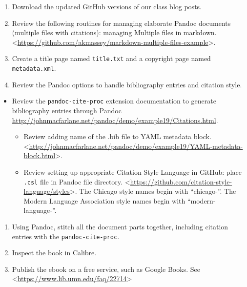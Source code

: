 \documentclass[]{article}
\begin{document}
\begin{enumerate}
\def\labelenumi{\arabic{enumi}.}
\itemsep1pt\parskip0pt
\item
  Download the updated GitHub versions of our class blog posts.
\item
  Review the following routines for managing elaborate Pandoc documents
  (multiple files with citations): managing Multiple files in markdown.
  \textless{}\url{https://github.com/akmassey/markdown-multiple-files-example}\textgreater{}.
\item
  Create a title page named \texttt{title.txt} and a copyright page
  named \texttt{metadata.xml}.
\item
  Review the Pandoc options to handle bibliography entries and citation
  style.
\end{enumerate}

\begin{itemize}
\itemsep1pt\parskip0pt
\item
  Review the \texttt{pandoc-cite-proc} extension documentation to
  generate bibliography entries through Pandoc
  \url{http://johnmacfarlane.net/pandoc/demo/example19/Citations.html}.

  \begin{itemize}
  \itemsep1pt\parskip0pt
  \item
    Review adding name of the .bib file to YAML metadata block.
    \textless{}\url{http://johnmacfarlane.net/pandoc/demo/example19/YAML-metadata-block.html}\textgreater{}.
  \item
    Review setting up appropriate Citation Style Language in GitHub:
    place \texttt{.csl} file in Pandoc file directory.
    \textless{}\url{https://github.com/citation-style-language/styles}\textgreater{}.
    The Chicago style names begin with ``chicago-''. The Modern Language
    Association style names begin with ``modern-language-''.
  \end{itemize}
\end{itemize}

\begin{enumerate}
\def\labelenumi{\arabic{enumi}.}
\setcounter{enumi}{4}
\itemsep1pt\parskip0pt
\item
  Using Pandoc, stitch all the document parts together, including
  citation entries with the \texttt{pandoc-cite-proc}.
\item
  Inspect the book in Calibre.
\item
  Publish the ebook on a free service, such as Google Books. See
  \textless{}\url{https://www.lib.umn.edu/faq/22714}\textgreater{}
\end{enumerate}
\end{document}

